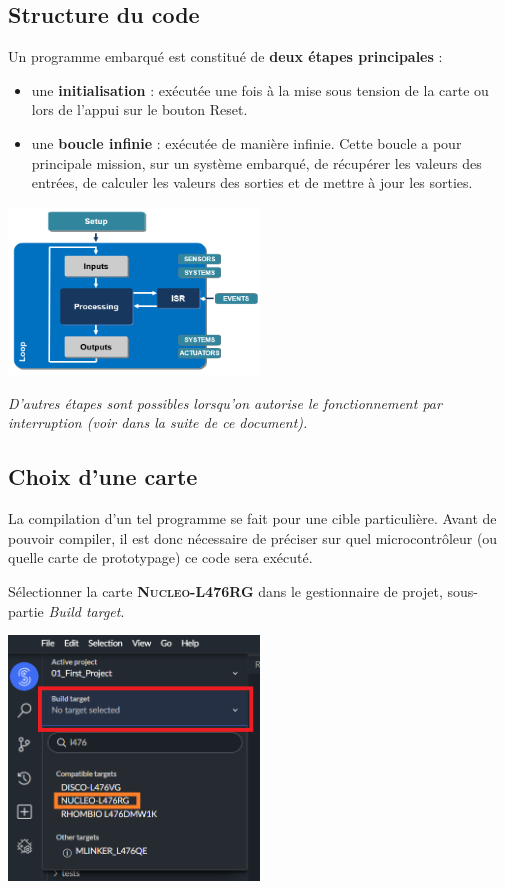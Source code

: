 \documentclass[a4paper,11pt,titlepage]{article} %
\begin{document}
\subsection{Structure du code}

Un programme embarqué est constitué de \textbf{deux étapes principales} : 

\begin{itemize}
	\item une \textbf{initialisation} : exécutée une fois à la mise sous tension de la carte ou lors de l'appui sur le bouton Reset.
	\item une \textbf{boucle infinie} : exécutée de manière infinie. Cette boucle a pour principale mission, sur un système embarqué, de récupérer les valeurs des entrées, de calculer les valeurs des sorties et de mettre à jour les sorties.
\end{itemize}

\begin{center}
	\includegraphics[width=0.5\textwidth]{images/arduino_program_structure.png}
\end{center}

\textit{D'autres étapes sont possibles lorsqu'on autorise le fonctionnement par interruption (voir dans la suite de ce document).}


\subsection{Choix d'une carte}

La compilation d'un tel programme se fait pour une cible particulière. Avant de pouvoir compiler, il est donc nécessaire de préciser sur quel microcontrôleur (ou quelle carte de prototypage) ce code sera exécuté.

Sélectionner la carte \textbf{\textsc{Nucleo-L476RG}} dans le gestionnaire de projet, sous-partie \textit{Build target}.

\begin{center}
	\includegraphics[width=0.5\textwidth]{images/keil_target_select.png}
\end{center}
\end{document}
